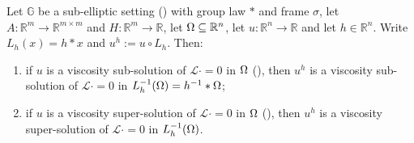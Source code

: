 \begin{lemma}[Lemma~2.9]
Let $\mathbb G$ be a sub-elliptic setting () with group law $*$ and
frame $\sigma$, let $A:\mathbb R^{m}\to\mathbb R^{m\times m}$ and
$H:\mathbb R^{m}\to\mathbb R$, let $\Omega\subseteq\mathbb R^{n}$, let
$u:\mathbb R^{n}\to\mathbb R$ and let $h\in\mathbb R^{n}$. Write $L_h(x)=h*x$ and
$u^{h}:=u\circ L_h$. Then:
\begin{enumerate}
\item if $u$ is a viscosity sub-solution of $\mathcal L\cdot=0$ in $\Omega$
  (), then $u^{h}$ is a viscosity sub-solution of
  $\mathcal L\cdot=0$ in $L_h^{-1}(\Omega)=h^{-1}*\Omega$;
\item if $u$ is a viscosity super-solution of $\mathcal L\cdot=0$ in $\Omega$
  (), then $u^{h}$ is a viscosity super-solution of
  $\mathcal L\cdot=0$ in $L_h^{-1}(\Omega)$.
\end{enumerate}
\end{lemma}
